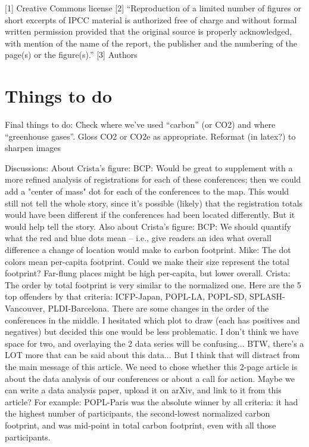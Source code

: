 \documentclass[12pt]{article}
\begin{document}
[1] Creative Commons license
[2] ``Reproduction of a limited number of figures or short excerpts of IPCC material is authorized free of charge and without formal written permission provided that the original source is properly acknowledged, with mention of the name of the report, the publisher and the numbering of the page(s) or the figure(s).''
[3] Authors


\section*{Things to do}

Final things to do:
Check where we’ve used ``carbon'' (or CO2) and where ``greenhouse gases''.  Gloss CO2 or CO2e as appropriate.
Reformat (in latex?) to sharpen images

Discussions:
About Crista’s figure:
BCP: Would be great to supplement with a more refined analysis of registrations for each of these conferences; then we could add a "center of mass" dot for each of the conferences to the map. This would still not tell the whole story, since it's possible (likely) that the registration totals would have been different if the conferences had been located differently. But it would help tell the story.
Also about Crista’s figure:
BCP: We should quantify what the red and blue dots mean -- i.e., give readers an idea what overall difference a change of location would make to carbon footprint.
Mike: The dot colors mean per-capita footprint. Could we make their size represent the total footprint? Far-flung places might be high per-capita, but lower overall.
Crista: The order by total footprint is very similar to the normalized one. Here are the 5 top offenders by that criteria: ICFP-Japan, POPL-LA, POPL-SD, SPLASH-Vancouver, PLDI-Barcelona. There are some changes in the order of the conferences in the middle. I hesitated which plot to draw (each has positives and negatives) but decided this one would be less problematic. I don't think we have space for two, and overlaying the 2 data series will be confusing...
BTW, there's a LOT more that can be said about this data... But I think that will distract from the main message of this article. We need to chose whether this 2-page article is about the data analysis of our conferences or about a call for action. Maybe we can write a data analysis paper, upload it on arXiv, and link to it from this article?
For example: POPL-Paris was the absolute winner by all criteria: it had the highest number of participants, the second-lowest normalized carbon footprint, and was mid-point in total carbon footprint, even with all those participants.
\end{document}
